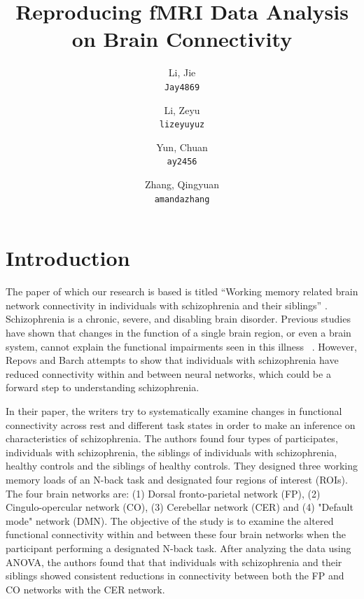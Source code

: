 \documentclass[11pt]{article}
\title{Reproducing fMRI Data Analysis on Brain Connectivity}
\author{
  Li, Jie\\
  \texttt{Jay4869}
  \and
  Li, Zeyu\\
  \texttt{lizeyuyuz}
  \and
  Yun, Chuan\\
  \texttt{ay2456}
  \and
  Zhang, Qingyuan\\
  \texttt{amandazhang}
}
\begin{document}
\maketitle


\section{Introduction}

The paper of which our research is based is titled ``Working memory related
brain network connectivity in individuals with schizophrenia and their
siblings'' \cite{repovs_barch1, repovs_barch2}. Schizophrenia is a chronic,
severe, and disabling brain disorder. Previous studies have shown that changes
in the function of a single brain region, or even a brain system, cannot
explain the functional impairments seen in this illness \ \cite{repovs_barch1}.
However, Repovs and Barch attempts to show that individuals with schizophrenia
have reduced connectivity within and between neural networks, which could be a
forward step to understanding schizophrenia. \par

In their paper, the writers try to systematically examine changes in functional
connectivity across rest and different task states in order to make an
inference on characteristics of schizophrenia. The authors found four types of
participates, individuals with schizophrenia, the siblings of individuals with
schizophrenia, healthy controls and the siblings of healthy controls. They
designed three working memory loads of an N-back task and designated four
regions of interest (ROIs). The four brain networks are: (1) Dorsal
fronto-parietal network (FP), (2) Cingulo-opercular network (CO), (3)
Cerebellar network (CER) and (4) "Default mode" network (DMN). The objective of
the study is to examine the altered functional connectivity within and between
these four brain networks when the participant performing a designated N-back
task. After analyzing the data using ANOVA, the authors found that that
individuals with schizophrenia and their siblings showed consistent reductions
in connectivity between both the FP and CO networks with the CER network. \par
\end{document}
